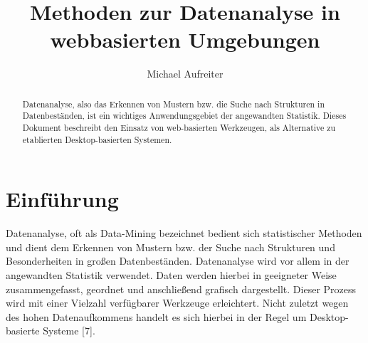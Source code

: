\documentclass[runningheads]{llncs}
\begin{document}
\setlength{\parindent}{0pt} 
\setlength{\parskip}{2ex}

\mainmatter  %

\title{Methoden zur Datenanalyse in webbasierten Umgebungen}


\author{Michael Aufreiter}

%



\maketitle


\begin{abstract}
Datenanalyse, also das Erkennen von Mustern bzw. die Suche nach Strukturen in Datenbeständen, ist ein wichtiges Anwendungsgebiet der angewandten Statistik. Dieses Dokument beschreibt den Einsatz von web-basierten Werkzeugen, als Alternative zu etablierten Desktop-basierten Systemen.
\end{abstract}




\section{Einführung}


Datenanalyse, oft als Data-Mining bezeichnet bedient sich statistischer Methoden und dient dem Erkennen von Mustern bzw. der Suche nach Strukturen und Besonderheiten in großen Datenbeständen. Datenanalyse wird vor allem in der angewandten Statistik verwendet. Daten werden hierbei in geeigneter Weise zusammengefasst, geordnet und anschließend grafisch dargestellt. Dieser Prozess wird mit einer Vielzahl verfügbarer Werkzeuge erleichtert. Nicht zuletzt wegen des hohen Datenaufkommens handelt es sich hierbei in der Regel um Desktop-basierte Systeme [7]. 
\end{document}
